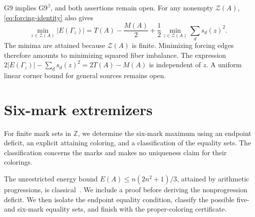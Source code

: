 \documentclass[11pt,a4paper]{article}
\theoremstyle{definition}
\newcommand{\Z}{\mathbb Z}
\numberwithin{equation}{section}
\begin{document}
G9 implies $\mathrm{G9}^{\exists}$, and both assertions remain open.
For any nonempty $\mathcal Z(A)$, \eqref{eq:forcing-identity} also gives
\begin{equation}\label{eq:coloring-selection}
\min_{z\in\mathcal Z(A)}|E(\Gamma_z)|
=T(A)-\frac{M(A)}2
+\frac12\min_{z\in\mathcal Z(A)}\sum_ds_d(z)^2.
\end{equation}
The minima are attained because $\mathcal Z(A)$ is finite.
Minimizing forcing edges therefore amounts to minimizing squared fiber
imbalance. The expression
$2|E(\Gamma_z)|-\sum_ds_d(z)^2=2T(A)-M(A)$ is independent of $z$.
A uniform linear corner bound for general sources remains open.

\section{Six-mark extremizers}\label{sec:six-mark-extremizers}\label{subsec:six-mark-extremizers}
For finite mark sets in $\Z$, we determine the six-mark maximum using an
endpoint deficit, an explicit attaining coloring, and a classification of
the equality sets. The classification concerns the marks and makes no
uniqueness claim for their colorings.

The unrestricted energy bound $E(A)\le n(2n^2+1)/3$, attained by arithmetic
progressions, is classical~\cite[Introduction]{Heg23}. We include a proof before
deriving the nonprogression deficit. We then isolate the endpoint equality
condition, classify the possible five- and six-mark equality sets, and finish
with the proper-coloring certificate.
\end{document}
